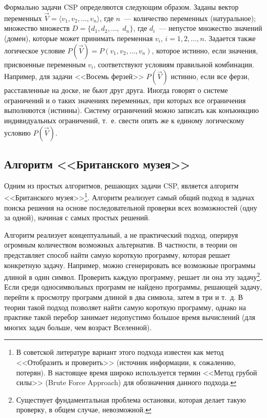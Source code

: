 \documentclass[a4paper,14pt, openany, twoside, draft]{extbook} %
\begin{document}
Формально задачи CSP определяются следующим образом. Заданы вектор переменных $\vec{V}=\langle v_1, v_2, \ldots, v_n\rangle$, где $n$~--- количество переменных (натуральное); множество множеств $D=\{ d_1, d_2, \ldots,$ $d_n\}$, где $d_i$~--- непустое множество значений (домен), которые может принимать переменная $v_i$, $i=1,2,\ldots,n$. Задается также логическое условие $P(\vec{V})=P(v_1,v_2,\ldots,v_n)$, которое истинно, если значения, присвоенные переменным $v_i$, соответствуют условиям правильной комбинации. Например, для задачи <<Восемь ферзей>> $P(\vec{V})$ истинно, если все ферзи, расставленные на доске, не бьют друг друга. Иногда говорят о системе ограничений и о таких значениях переменных, при которых все ограничения выполняются (истинны). Систему ограничений можно записать как конъюнкцию индивидуальных ограничений, т.~е. свести опять же к единому логическому условию $P(\vec{V})$.

\subsection{Алгоритм <<Британского музея>>}

Одним из простых алгоритмов, решающих задачи CSP, является алгоритм <<Британского музея>>\footnote{В советской литературе вариант этого подхода известен как метод <<Отобразить и проверить>> (источник информации, к сожалению, потерян). В настоящее время широко используется термин <<Метод грубой силы>> (Brute Force Approach) для обозначения данного подхода.}. Алгоритм реализует самый общий подход в задачах поиска решения на основе последовательной проверки всех возможностей (одну за одной), начиная с самых простых решений.

Алгоритм реализует концептуальный, а не практический подход, оперируя огромным количеством возможных альтернатив. В частности, в теории он представляет способ найти самую короткую программу, которая решает конкретную задачу. Например, можно сгенерировать все возможные программы длиной в один символ. Проверить каждую программу, решает ли она эту задачу\footnote{Существует фундаментальная проблема остановки, которая делает такую проверку, в общем случае, невозможной.}. Если среди односимвольных программ не найдено программы, решающей задачу, перейти к просмотру программ длиной в два символа, затем в три и т.~д. В теории такой подход позволяет найти самую короткую программу, однако на практике такой перебор занимает недопустимо большое время вычислений (для многих задач больше, чем возраст Вселенной).
\end{document}
